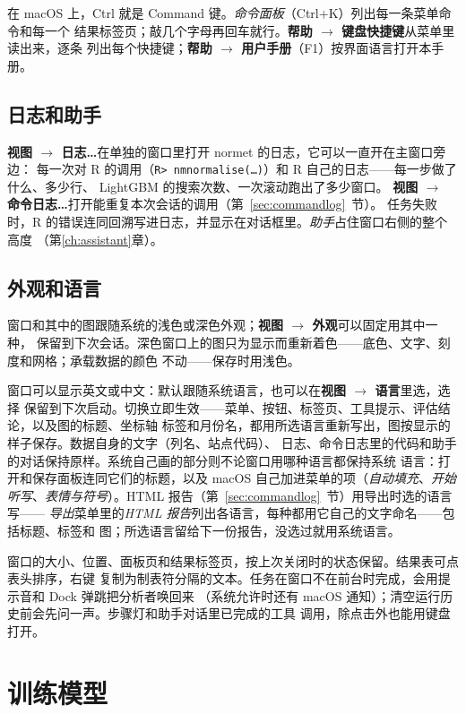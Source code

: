 \documentclass[11pt]{ctexrep}
\newcommand{\nm}{\textsf{normet}}
\newcommand{\codeunderscore}{\textunderscore\allowbreak}
\newcommand{\code}[1]{\texttt{\let\_\codeunderscore #1}}
\newcommand{\tab}[1]{\textbf{#1}}
\begin{document}
在 macOS 上，Ctrl 就是 Command 键。\emph{命令面板}（Ctrl+K）列出每一条菜单命令和每一个
结果标签页；敲几个字母再回车就行。\tab{帮助 $\rightarrow$ 键盘快捷键}从菜单里读出来，逐条
列出每个快捷键；\tab{帮助 $\rightarrow$ 用户手册}（F1）按界面语言打开本手册。

\section{日志和助手}
\tab{视图 $\rightarrow$ 日志…}在单独的窗口里打开 \nm{} 的日志，它可以一直开在主窗口旁边：
每一次对 R 的调用（\code{R> nm\_normalise(…)}）和 R 自己的日志——每一步做了什么、多少行、
LightGBM 的搜索次数、一次滚动跑出了多少窗口。
\tab{视图 $\rightarrow$ 命令日志…}打开能重复本次会话的调用（第~\ref{sec:commandlog}~节）。
任务失败时，R 的错误连同回溯写进日志，并显示在对话框里。\emph{助手}占住窗口右侧的整个高度
（第\ref{ch:assistant}章）。

\section{外观和语言}\label{sec:appearance}
窗口和其中的图跟随系统的浅色或深色外观；\tab{视图 $\rightarrow$ 外观}可以固定用其中一种，
保留到下次会话。深色窗口上的图只为显示而重新着色——底色、文字、刻度和网格；承载数据的颜色
不动——保存时用浅色。

窗口可以显示英文或中文：默认跟随系统语言，也可以在\tab{视图 $\rightarrow$ 语言}里选，选择
保留到下次启动。切换立即生效——菜单、按钮、标签页、工具提示、评估结论，以及图的标题、坐标轴
标签和月份名，都用所选语言重新写出，图按显示的样子保存。数据自身的文字（列名、站点代码）、
日志、命令日志里的代码和助手的对话保持原样。系统自己画的部分则不论窗口用哪种语言都保持系统
语言：打开和保存面板连同它们的标题，以及 macOS 自己加进菜单的项（\emph{自动填充}、\emph{开始
听写}、\emph{表情与符号}）。HTML 报告（第~\ref{sec:commandlog}~节）用导出时选的语言写——
\emph{导出}菜单里的\emph{HTML 报告}列出各语言，每种都用它自己的文字命名——包括标题、标签和
图；所选语言留给下一份报告，没选过就用系统语言。

窗口的大小、位置、面板页和结果标签页，按上次关闭时的状态保留。结果表可点表头排序，右键
复制为制表符分隔的文本。任务在窗口不在前台时完成，会用提示音和 Dock 弹跳把分析者唤回来
（系统允许时还有 macOS 通知）；清空运行历史前会先问一声。步骤灯和助手对话里已完成的工具
调用，除点击外也能用键盘打开。

\chapter{训练模型}\label{ch:train}
\end{document}
